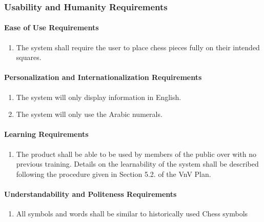 \documentclass[12pt]{article}
\begin{document}
\subsubsection{Usability and Humanity Requirements}
\label{NFR_UH}
\paragraph{Ease of Use Requirements}
\begin{enumerate}[{UH}1., leftmargin=2\parindent]
    \item The system shall require the user to place chess pieces fully on their intended squares.

\end{enumerate}

\paragraph{Personalization and Internationalization Requirements}
\begin{enumerate}[{UH}1., leftmargin=2\parindent, resume]
    \item The system will only display information in English.
    \item The system will only use the Arabic numerals.
\end{enumerate}

\paragraph{Learning Requirements}
\begin{enumerate}[{UH}1., leftmargin=2\parindent, resume]
    \item The product shall be able to be used by members of the public over with no previous training. Details on the learnability 
    of the system shall be described following the procedure given in Section 5.2.\thevnvSectionNfr{}
    of the VnV Plan.
\end{enumerate}

\paragraph{Understandability and Politeness Requirements}
\begin{enumerate}[{UH}1., leftmargin=2\parindent, resume]
    \item All symbols and words shall be similar to historically used Chess symbols \cite{ChessHistory2003}
\end{enumerate}
\end{document}
